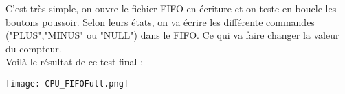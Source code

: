 \pagebreak C'est très simple, on ouvre le fichier FIFO en écriture et on teste en boucle les boutons poussoir. Selon leurs états, on va écrire les différente commandes ("PLUS","MINUS" ou "NULL") dans le FIFO. Ce qui va faire changer la valeur du compteur.\\

Voilà le résultat de ce test final :

\begin{center} 
\hspace{12.45cm}
\texttt{[image: CPU\_FIFOFull.png]}
\end{center}
\vspace{1cm}


 


